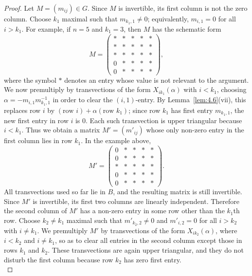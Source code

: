 \documentclass[../Odyssey_Project.tex]{subfiles}
\begin{document}
\begin{proof}
Let $M=(m_{ij})\in G$. Since $M$ is invertible, its first column is not the zero column. Choose $k_1$ maximal such that $m_{k_1,1}\neq 0$; equivalently, $m_{i,1}=0$ for all $i>k_1$. For example, if $n=5$ and $k_1=3$, then $M$ has the schematic form
\[
    M=
    \begin{pmatrix}
        \ast & \ast & \ast & \ast & \ast\\
        \ast & \ast & \ast & \ast & \ast\\
        \ast & \ast & \ast & \ast & \ast\\
        0    & \ast & \ast & \ast & \ast\\
        0    & \ast & \ast & \ast & \ast
    \end{pmatrix},
\]
where the symbol $\ast$ denotes an entry whose value is not relevant to the argument.\\
We now premultiply by transvections of the form $X_{i k_1}(\alpha)$ with $i<k_1$, choosing $\alpha=-m_{i,1}m_{k_1,1}^{-1}$ in order to clear the $(i,1)$-entry. By Lemma~\ref{lem:4.6}(vii), this replaces row $i$ by $(\text{row }i)+\alpha(\text{row }k_1)$; since row $k_1$ has first entry $m_{k_1,1}$, the new first entry in row $i$ is $0$. Each such transvection is upper triangular because $i<k_1$. Thus we obtain a matrix $M'=(m'_{ij})$ whose only non-zero entry in the first column lies in row $k_1$. In the example above,
\[
    M'=
    \begin{pmatrix}
        0    & \ast & \ast & \ast & \ast\\
        0    & \ast & \ast & \ast & \ast\\
        \ast & \ast & \ast & \ast & \ast\\
        0    & \ast & \ast & \ast & \ast\\
        0    & \ast & \ast & \ast & \ast
    \end{pmatrix}.
\]
All transvections used so far lie in $B$, and the resulting matrix is still invertible.\\
Since $M'$ is invertible, its first two columns are linearly independent. Therefore the second column of $M'$ has a non-zero entry in some row other than the $k_1$th row. Choose $k_2\neq k_1$ maximal such that $m'_{k_2,2}\neq 0$ and $m'_{i,2}=0$ for all $i>k_2$ with $i\neq k_1$. We premultiply $M'$ by transvections of the form $X_{i k_2}(\alpha)$, where $i<k_2$ and $i\neq k_1$, so as to clear all entries in the second column except those in rows $k_1$ and $k_2$. These transvections are again upper triangular, and they do not disturb the first column because row $k_2$ has zero first entry.\\

\end{proof}
\end{document}
